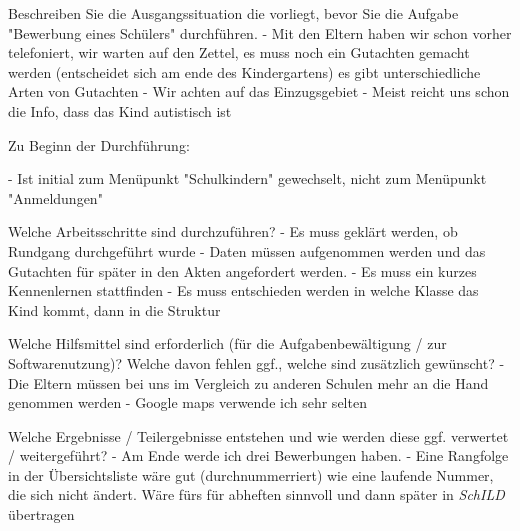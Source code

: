 Beschreiben Sie die Ausgangssituation die vorliegt, bevor Sie die Aufgabe "Bewerbung eines Schülers" durchführen.		
- Mit den Eltern haben wir schon vorher telefoniert, wir warten auf den Zettel, es muss noch ein Gutachten gemacht werden (entscheidet sich am ende des Kindergartens) es gibt unterschiedliche Arten von Gutachten
- Wir achten auf das Einzugsgebiet
- Meist reicht uns schon die Info, dass das Kind autistisch ist						















Zu Beginn der Durchführung:		


- Ist initial zum Menüpunkt "Schulkindern" gewechselt, nicht zum Menüpunkt "Anmeldungen"








Welche Arbeitsschritte sind durchzuführen?		
- Es muss geklärt werden, ob Rundgang durchgeführt wurde
- Daten müssen aufgenommen werden und das Gutachten für später in den Akten angefordert werden.
- Es muss ein kurzes Kennenlernen stattfinden
- Es muss entschieden werden in welche Klasse das Kind kommt, dann in die Struktur




Welche Hilfsmittel sind erforderlich (für die Aufgabenbewältigung / zur Softwarenutzung)? Welche davon fehlen ggf., welche sind zusätzlich gewünscht?
- Die Eltern müssen bei uns im Vergleich zu anderen Schulen mehr an die Hand genommen werden
- Google maps verwende ich sehr selten















Welche Ergebnisse / Teilergebnisse entstehen und wie werden diese ggf. verwertet / weitergeführt?		
- Am Ende werde ich drei Bewerbungen haben.
- Eine Rangfolge in der Übersichtsliste wäre gut (durchnummerriert) wie eine laufende Nummer, die sich nicht ändert. Wäre fürs für abheften sinnvoll und dann später in \textit{SchILD} übertragen







